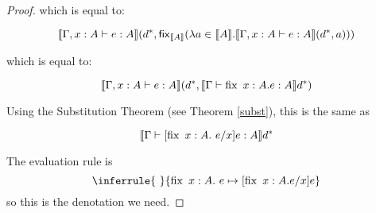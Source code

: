 \begin{proof}
which is equal to:

\[\llbracket \Gamma, x : A \vdash e : A \rrbracket(d^*, \operatorname{\mathsf{fix}}_{\llbracket A \rrbracket} (\lambda a \in \llbracket A \rrbracket . \llbracket \Gamma, x : A \vdash e : A \rrbracket(d^*, a)))
\]

which is equal to:

\[\llbracket \Gamma, x : A \vdash e : A \rrbracket(d^*, \llbracket \Gamma \vdash \operatorname{fix} \ x:A .e : A \rrbracket d^*)
\]

Using the Substitution Theorem (see Theorem \ref{subst}), this is the same as

\[\llbracket \Gamma \vdash [\fix \ x:A. \ e/x] e : A \rrbracket d^* \]
 
 
The evaluation rule is 
$$
\inferrule{ \ }
{\fix \ x:A. \ e \mapsto [\fix \ x:A. e/x]e}
$$
so this is the denotation we need.
\end{proof}